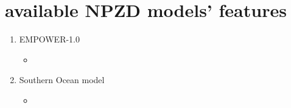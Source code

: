 \documentclass[a4paper,11pt]{article}
\begin{document}
    \section{available NPZD models' features}
    \begin{enumerate}
        \item EMPOWER-1.0\autocite{anderson2015empower}
        \begin{itemize}
            \item 
        \end{itemize}
        \item Southern Ocean model\autocite{kidston2013phytoplankton}
        \begin{itemize}
            \item 
        \end{itemize}
    \end{enumerate}
    
    \nocite{*}\printbibliography
\end{document}
